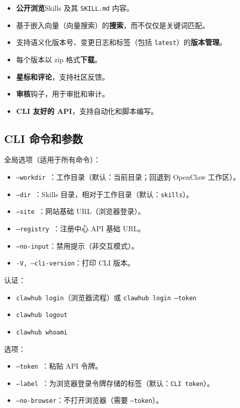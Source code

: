 \begin{itemize}
  \item \textbf{公开浏览}Skills 及其 \texttt{SKILL.md} 内容。
  \item 基于嵌入向量（向量搜索）的\textbf{搜索}，而不仅仅是关键词匹配。
  \item 支持语义化版本号、变更日志和标签（包括 \texttt{latest}）的\textbf{版本管理}。
  \item 每个版本以 zip 格式\textbf{下载}。
  \item \textbf{星标和评论}，支持社区反馈。
  \item \textbf{审核}钩子，用于审批和审计。
  \item \textbf{CLI 友好的 API}，支持自动化和脚本编写。
\end{itemize}


\subsection{CLI 命令和参数}


全局选项（适用于所有命令）：

\begin{itemize}
  \item \texttt{--workdir }：工作目录（默认：当前目录；回退到 OpenClaw 工作区）。
  \item \texttt{--dir }：Skills 目录，相对于工作目录（默认：\texttt{skills}）。
  \item \texttt{--site }：网站基础 URL（浏览器登录）。
  \item \texttt{--registry }：注册中心 API 基础 URL。
  \item \texttt{--no-input}：禁用提示（非交互模式）。
  \item \texttt{-V, --cli-version}：打印 CLI 版本。
\end{itemize}


认证：

\begin{itemize}
  \item \texttt{clawhub login}（浏览器流程）或 \texttt{clawhub login --token }
  \item \texttt{clawhub logout}
  \item \texttt{clawhub whoami}
\end{itemize}


选项：

\begin{itemize}
  \item \texttt{--token }：粘贴 API 令牌。
  \item \texttt{--label }：为浏览器登录令牌存储的标签（默认：\texttt{CLI token}）。
  \item \texttt{--no-browser}：不打开浏览器（需要 \texttt{--token}）。
\end{itemize}


